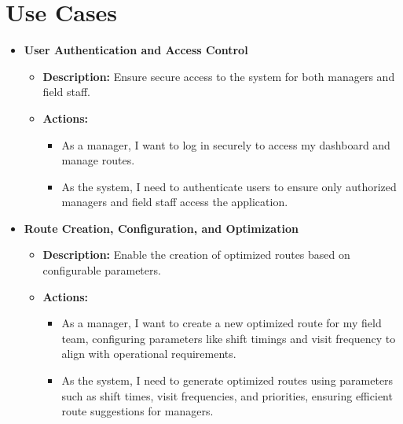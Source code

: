 \section{Use Cases}
\begin{itemize}
    \item \textbf{User Authentication and Access Control}
    \begin{itemize}
        \item \textbf{Description:} Ensure secure access to the system for both managers and field staff.
        \item \textbf{Actions:}
        \begin{itemize}
            \item As a manager, I want to log in securely to access my dashboard and manage routes.
            \item As the system, I need to authenticate users to ensure only authorized managers and field staff access the application.
        \end{itemize}
    \end{itemize}
    
    \item \textbf{Route Creation, Configuration, and Optimization}
    \begin{itemize}
        \item \textbf{Description:} Enable the creation of optimized routes based on configurable parameters.
        \item \textbf{Actions:}
        \begin{itemize}
            \item As a manager, I want to create a new optimized route for my field team, configuring parameters like shift timings and visit frequency to align with operational requirements.
            \item As the system, I need to generate optimized routes using parameters such as shift times, visit frequencies, and priorities, ensuring efficient route suggestions for managers.
        \end{itemize}
    \end{itemize}
    

\end{itemize}
